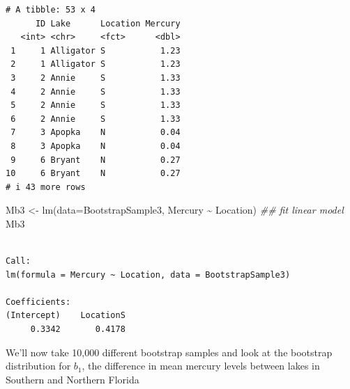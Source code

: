 \documentclass[
  letterpaper,
  DIV=11,
  numbers=noendperiod]{scrreprt}
\newenvironment{Shaded}{\begin{snugshade}}{\end{snugshade}}
\newcommand{\AttributeTok}[1]{\textcolor[rgb]{0.40,0.45,0.13}{#1}}
\newcommand{\DocumentationTok}[1]{\textcolor[rgb]{0.37,0.37,0.37}{\textit{#1}}}
\newcommand{\FunctionTok}[1]{\textcolor[rgb]{0.28,0.35,0.67}{#1}}
\newcommand{\NormalTok}[1]{\textcolor[rgb]{0.00,0.23,0.31}{#1}}
\newcommand{\OtherTok}[1]{\textcolor[rgb]{0.00,0.23,0.31}{#1}}
\newcommand{\SpecialCharTok}[1]{\textcolor[rgb]{0.37,0.37,0.37}{#1}}
\begin{document}
\begin{verbatim}
# A tibble: 53 x 4
      ID Lake      Location Mercury
   <int> <chr>     <fct>      <dbl>
 1     1 Alligator S           1.23
 2     1 Alligator S           1.23
 3     2 Annie     S           1.33
 4     2 Annie     S           1.33
 5     2 Annie     S           1.33
 6     2 Annie     S           1.33
 7     3 Apopka    N           0.04
 8     3 Apopka    N           0.04
 9     6 Bryant    N           0.27
10     6 Bryant    N           0.27
# i 43 more rows
\end{verbatim}

\begin{Shaded}
\begin{Highlighting}[]
\NormalTok{Mb3 }\OtherTok{\textless{}{-}} \FunctionTok{lm}\NormalTok{(}\AttributeTok{data=}\NormalTok{BootstrapSample3, Mercury }\SpecialCharTok{\textasciitilde{}}\NormalTok{ Location) }\DocumentationTok{\#\# fit linear model}
\NormalTok{Mb3}
\end{Highlighting}
\end{Shaded}

\begin{verbatim}

Call:
lm(formula = Mercury ~ Location, data = BootstrapSample3)

Coefficients:
(Intercept)    LocationS  
     0.3342       0.4178  
\end{verbatim}

We'll now take 10,000 different bootstrap samples and look at the
bootstrap distribution for \(b_1\), the difference in mean mercury
levels between lakes in Southern and Northern Florida
\end{document}
